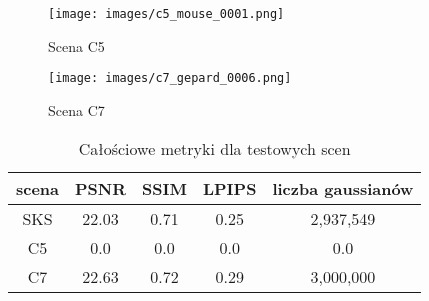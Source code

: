 \begin{figure}[!h]
    \centering
    \texttt{[image: images/c5\_mouse\_0001.png]}
    \caption{Scena C5}
    \label{fig:c5_gs}
\end{figure}

\begin{figure}[!h]
    \centering
    \texttt{[image: images/c7\_gepard\_0006.png]}
    \caption{Scena C7}
    \label{fig:c7_gs}
\end{figure}

\begin{table}[!h]
    \centering
    \begin{tabular}{|c|c|c|c|c|}
    \hline
    scena & PSNR & SSIM & LPIPS & liczba gaussianów \\
    \hline 
    SKS & 22.03 & 0.71 & 0.25 & 2,937,549 \\
    \hline 
    C5 & 0.0 & 0.0 & 0.0 & 0.0 \\
    \hline 
    C7 & 22.63 & 0.72 & 0.29 & 3,000,000 \\
    \hline
    \end{tabular}
\caption{Całościowe metryki dla testowych scen}
\label{table:tab_conf_sks}
\end{table}
